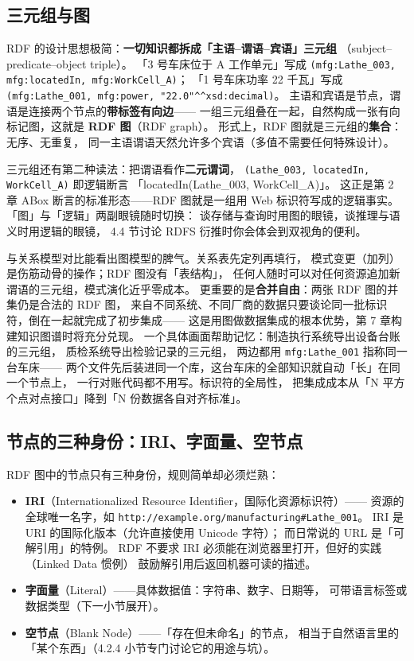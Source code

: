 \subsection{三元组与图}

RDF 的设计思想极简：\textbf{一切知识都拆成「主语--谓语--宾语」三元组}
（subject--predicate--object triple）。
「3 号车床位于 A 工作单元」写成
\texttt{(mfg:Lathe\_003, mfg:locatedIn, mfg:WorkCell\_A)}；
「1 号车床功率 22 千瓦」写成
\texttt{(mfg:Lathe\_001, mfg:power, "22.0"\^{}\^{}xsd:decimal)}。
主语和宾语是节点，谓语是连接两个节点的\textbf{带标签有向边}——
一组三元组叠在一起，自然构成一张有向标记图，这就是 \textbf{RDF 图}（RDF graph）。
形式上，RDF 图就是三元组的\textbf{集合}：无序、无重复，
同一主语谓语天然允许多个宾语（多值不需要任何特殊设计）。

三元组还有第二种读法：把谓语看作\textbf{二元谓词}，
\texttt{(Lathe\_003, locatedIn, WorkCell\_A)} 即逻辑断言
「locatedIn(Lathe\_003, WorkCell\_A)」。
这正是第 2 章 ABox 断言的标准形态——RDF 图就是一组用 Web
标识符写成的逻辑事实。「图」与「逻辑」两副眼镜随时切换：
谈存储与查询时用图的眼镜，谈推理与语义时用逻辑的眼镜，
4.4 节讨论 RDFS 衍推时你会体会到双视角的便利。

与关系模型对比能看出图模型的脾气。关系表先定列再填行，
模式变更（加列）是伤筋动骨的操作；RDF 图没有「表结构」，
任何人随时可以对任何资源追加新谓语的三元组，模式演化近乎零成本。
更重要的是\textbf{合并自由}：两张 RDF 图的并集仍是合法的 RDF 图，
来自不同系统、不同厂商的数据只要谈论同一批标识符，倒在一起就完成了初步集成——
这是用图做数据集成的根本优势，第 7 章构建知识图谱时将充分兑现。
一个具体画面帮助记忆：制造执行系统导出设备台账的三元组，
质检系统导出检验记录的三元组，
两边都用 \texttt{mfg:Lathe\_001} 指称同一台车床——
两个文件先后装进同一个库，这台车床的全部知识就自动「长」在同一个节点上，
一行对账代码都不用写。标识符的全局性，
把集成成本从「N 平方个点对点接口」降到「N 份数据各自对齐标准」。

\subsection{节点的三种身份：IRI、字面量、空节点}

RDF 图中的节点只有三种身份，规则简单却必须烂熟：

\begin{itemize}
  \item \textbf{IRI}（Internationalized Resource Identifier，国际化资源标识符）——
        资源的全球唯一名字，如 \nolinkurl{http://example.org/manufacturing#Lathe_001}。
        IRI 是 URI 的国际化版本（允许直接使用 Unicode 字符）；
        而日常说的 URL 是「可解引用」的特例。
        RDF 不要求 IRI 必须能在浏览器里打开，但好的实践（Linked Data 惯例）
        鼓励解引用后返回机器可读的描述。
  \item \textbf{字面量}（Literal）——具体数据值：字符串、数字、日期等，
        可带语言标签或数据类型（下一小节展开）。
  \item \textbf{空节点}（Blank Node）——「存在但未命名」的节点，
        相当于自然语言里的「某个东西」（4.2.4 小节专门讨论它的用途与坑）。
\end{itemize}

